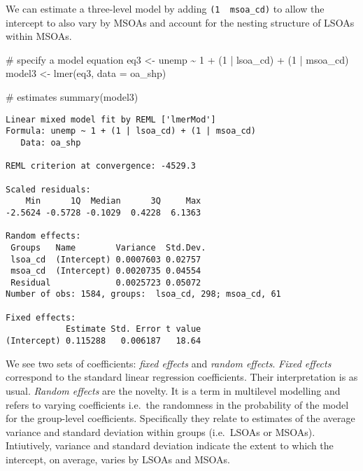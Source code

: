 \documentclass[
  letterpaper,
  krantz2]{style/krantz}
\newenvironment{Shaded}{\begin{snugshade}}{\end{snugshade}}
\newcommand{\AttributeTok}[1]{\textcolor[rgb]{0.40,0.45,0.13}{#1}}
\newcommand{\CommentTok}[1]{\textcolor[rgb]{0.37,0.37,0.37}{#1}}
\newcommand{\DecValTok}[1]{\textcolor[rgb]{0.68,0.00,0.00}{#1}}
\newcommand{\FunctionTok}[1]{\textcolor[rgb]{0.28,0.35,0.67}{#1}}
\newcommand{\NormalTok}[1]{\textcolor[rgb]{0.00,0.23,0.31}{#1}}
\newcommand{\OtherTok}[1]{\textcolor[rgb]{0.00,0.23,0.31}{#1}}
\newcommand{\SpecialCharTok}[1]{\textcolor[rgb]{0.37,0.37,0.37}{#1}}
\begin{document}
We can estimate a three-level model by adding
\texttt{(1\ \textbar{}\ msoa\_cd)} to allow the intercept to also vary
by MSOAs and account for the nesting structure of LSOAs within MSOAs.

\begin{Shaded}
\begin{Highlighting}[]
\CommentTok{\# specify a model equation}
\NormalTok{eq3 }\OtherTok{\textless{}{-}}\NormalTok{ unemp }\SpecialCharTok{\textasciitilde{}} \DecValTok{1} \SpecialCharTok{+}\NormalTok{ (}\DecValTok{1} \SpecialCharTok{|}\NormalTok{ lsoa\_cd) }\SpecialCharTok{+}\NormalTok{ (}\DecValTok{1} \SpecialCharTok{|}\NormalTok{ msoa\_cd)}
\NormalTok{model3 }\OtherTok{\textless{}{-}} \FunctionTok{lmer}\NormalTok{(eq3, }\AttributeTok{data =}\NormalTok{ oa\_shp)}

\CommentTok{\# estimates}
\FunctionTok{summary}\NormalTok{(model3)}
\end{Highlighting}
\end{Shaded}

\begin{verbatim}
Linear mixed model fit by REML ['lmerMod']
Formula: unemp ~ 1 + (1 | lsoa_cd) + (1 | msoa_cd)
   Data: oa_shp

REML criterion at convergence: -4529.3

Scaled residuals: 
    Min      1Q  Median      3Q     Max 
-2.5624 -0.5728 -0.1029  0.4228  6.1363 

Random effects:
 Groups   Name        Variance  Std.Dev.
 lsoa_cd  (Intercept) 0.0007603 0.02757 
 msoa_cd  (Intercept) 0.0020735 0.04554 
 Residual             0.0025723 0.05072 
Number of obs: 1584, groups:  lsoa_cd, 298; msoa_cd, 61

Fixed effects:
            Estimate Std. Error t value
(Intercept) 0.115288   0.006187   18.64
\end{verbatim}

We see two sets of coefficients: \emph{fixed effects} and \emph{random
effects}. \emph{Fixed effects} correspond to the standard linear
regression coefficients. Their interpretation is as usual. \emph{Random
effects} are the novelty. It is a term in multilevel modelling and
refers to varying coefficients i.e.~the randomness in the probability of
the model for the group-level coefficients. Specifically they relate to
estimates of the average variance and standard deviation within groups
(i.e.~LSOAs or MSOAs). Intiutively, variance and standard deviation
indicate the extent to which the intercept, on average, varies by LSOAs
and MSOAs.
\end{document}
